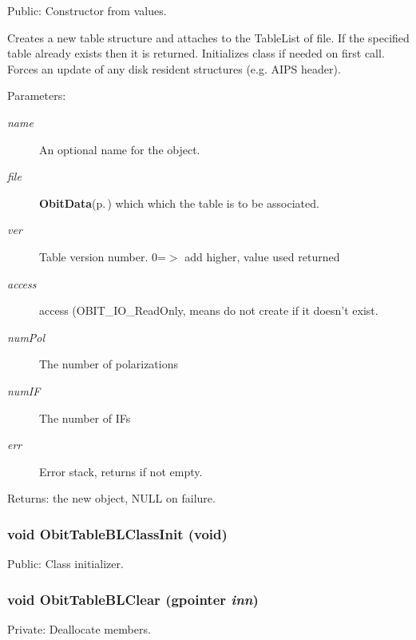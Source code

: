 Public: Constructor from values. 

Creates a new table structure and attaches to the Table\-List of file. If the specified table already exists then it is returned. Initializes class if needed on first call. Forces an update of any disk resident structures (e.g. AIPS header). \begin{Desc}
\item[Parameters:]
\begin{description}
\item[{\em name}]An optional name for the object. \item[{\em file}]{\bf Obit\-Data}{\rm (p.\,\pageref{structObitData})} which which the table is to be associated. \item[{\em ver}]Table version number. 0=$>$ add higher, value used returned \item[{\em access}]access (OBIT\_\-IO\_\-Read\-Only, means do not create if it doesn't exist. \item[{\em num\-Pol}]The number of polarizations \item[{\em num\-IF}]The number of IFs \item[{\em err}]Error stack, returns if not empty. \end{description}
\end{Desc}
\begin{Desc}
\item[Returns:]the new object, NULL on failure. \end{Desc}
\subsubsection{\setlength{\rightskip}{0pt plus 5cm}void Obit\-Table\-BLClass\-Init (void)}\label{ObitTableBL_8c_a27}


Public: Class initializer. 

\subsubsection{\setlength{\rightskip}{0pt plus 5cm}void Obit\-Table\-BLClear (gpointer {\em inn})}\label{ObitTableBL_8c_a9}


Private: Deallocate members. 


